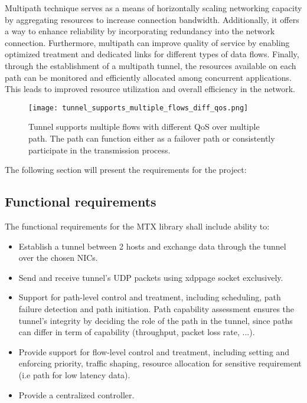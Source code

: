 Multipath technique serves as a means of horizontally scaling networking capacity by aggregating resources to increase connection bandwidth. 
Additionally, it offers a way to enhance reliability by incorporating redundancy into the network connection. Furthermore, multipath can improve quality of service by enabling optimized treatment and dedicated links for different types of data flows.
Finally, through the establishment of a multipath tunnel, the resources available on each path can be monitored and efficiently allocated among concurrent applications. 
This leads to improved resource utilization and overall efficiency in the network.

\begin{figure}[H]
	\centering
	\texttt{[image: tunnel\_supports\_multiple\_flows\_diff\_qos.png]}
	\caption{Tunnel supports multiple flows with different QoS over multiple path. The path can function either as a failover path or consistently participate in the transmission process.}\label{fig:reqs:tunnel_supports_multiple_flows_diff_qos}
\end{figure}

The following section will present the requirements for the project:

\subsection{Functional requirements}
The functional requirements for the \ac{MTX} library shall include ability to:
\begin{itemize}
    \item Establish a tunnel between 2 hosts and exchange data through the tunnel over the chosen \ac{NIC}s.
    \item Send and receive tunnel's UDP packets using \ac{xdppage} socket exclusively.
    \item Support for path-level control and treatment, including scheduling, path failure detection and path initiation.
    Path capability assessment ensures the tunnel's integrity by deciding the role of the path in the tunnel, since paths can differ in term of capability (throughput, packet loss rate, ...).
    \item Provide support for flow-level control and treatment, including setting and enforcing priority, traffic shaping, resource allocation for sensitive requirement (i.e path for low latency data).
    \item Provide a centralized controller.
\end{itemize}

